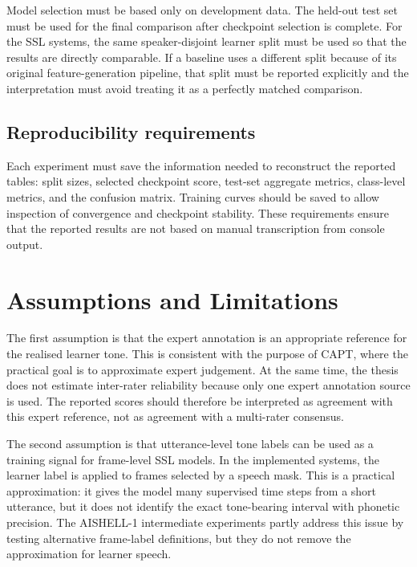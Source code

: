 Model selection must be based only on development data. The held-out test set
must be used for the final comparison after checkpoint selection is complete.
For the SSL systems, the same speaker-disjoint learner split must be used so
that the results are directly comparable. If a baseline uses a different split
because of its original feature-generation pipeline, that split must be reported
explicitly and the interpretation must avoid treating it as a perfectly matched
comparison.

\subsection{Reproducibility requirements}
\label{sec:proposal:requirements:reproducibility}

Each experiment must save the information needed to reconstruct the reported
tables: split sizes, selected checkpoint score, test-set aggregate metrics,
class-level metrics, and the confusion matrix. Training curves should be saved
to allow inspection of convergence and checkpoint stability. These requirements ensure that the reported results are
not based on manual transcription from console output.

\section{Assumptions and Limitations}
\label{sec:proposal:assumptions}

The first assumption is that the expert annotation is an appropriate reference
for the realised learner tone. This is consistent with the purpose of CAPT,
where the practical goal is to approximate expert judgement. At the same time,
the thesis does not estimate inter-rater reliability because only one expert
annotation source is used. The reported scores should therefore be interpreted
as agreement with this expert reference, not as agreement with a multi-rater
consensus.

The second assumption is that utterance-level tone labels can be used as a
training signal for frame-level SSL models. In the implemented systems, the
learner label is applied to frames selected by a speech mask. This is a practical
approximation: it gives the model many supervised time steps from a short
utterance, but it does not identify the exact tone-bearing interval with
phonetic precision. The AISHELL-1 intermediate experiments partly address this
issue by testing alternative frame-label definitions, but they do not remove the
approximation for learner speech.

